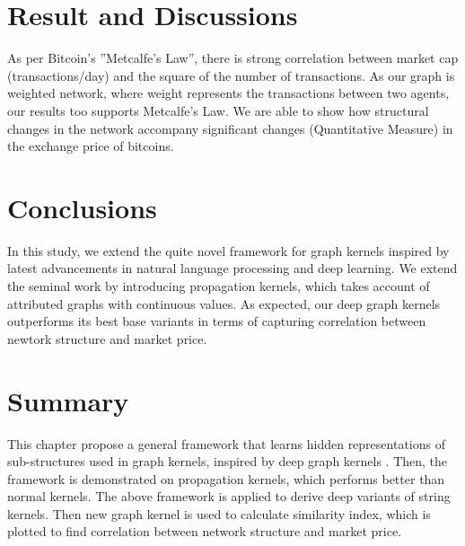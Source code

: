 \section{Result and Discussions}
As per Bitcoin’s ”Metcalfe’s Law”, there is strong correlation between
market cap (transactions/day) and the square of the number of
transactions. As our graph is weighted network, where weight
represents the transactions between two agents, our results too
supports Metcalfe’s Law. We are able to show how structural changes in the network accompany significant changes (Quantitative Measure) in the
exchange price of bitcoins.

\section{Conclusions}
 In this study, we extend the quite novel framework for graph kernels inspired by latest advancements in natural language processing and deep learning. We extend the seminal work \citep{Yanardag2015} by introducing propagation kernels, which takes account of attributed graphs with continuous values. As expected, our deep graph kernels outperforms its best base variants in terms of capturing correlation between newtork structure and market price.
 
\section{Summary}
This chapter propose a general framework that learns hidden representations of sub-structures used in graph kernels, inspired
by deep graph kernels \citep{Yanardag2015}. Then, the framework  is demonstrated on propagation kernels, which performs better than normal kernels. The above framework is applied to derive deep variants of
string kernels. Then new graph kernel is used to calculate similarity index, which is plotted to find correlation between network structure and market price.



